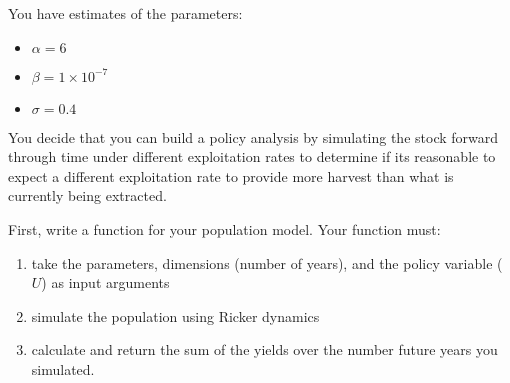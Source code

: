 \documentclass[]{book}
\providecommand{\tightlist}{%
  \setlength{\itemsep}{0pt}\setlength{\parskip}{0pt}}
\theoremstyle{definition}
\theoremstyle{definition}
\theoremstyle{definition}
\theoremstyle{remark}
\begin{document}
You have estimates of the parameters:

\begin{itemize}
\tightlist
\item
  \(\alpha = 6\)
\item
  \(\beta = 1 \times 10^{-7}\)
\item
  \(\sigma = 0.4\)
\end{itemize}

You decide that you can build a policy analysis by simulating the stock
forward through time under different exploitation rates to determine if
its reasonable to expect a different exploitation rate to provide more
harvest than what is currently being extracted.

First, write a function for your population model. Your function must:

\begin{enumerate}
\def\labelenumi{\arabic{enumi}.}
\tightlist
\item
  take the parameters, dimensions (number of years), and the policy
  variable (\(U\)) as input arguments
\item
  simulate the population using Ricker dynamics
\item
  calculate and return the sum of the yields over the number future
  years you simulated.
\end{enumerate}
\end{document}
